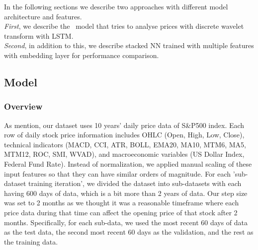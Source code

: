 


In the following sections we describe two approaches with different model architecture and features. \\ 
{\em First}, we describe the \scheme\ model that tries to analyse prices with discrete wavelet transform with LSTM. \\
{\em Second}, in addition to this, we describe stacked NN trained with multiple features with embedding layer for performance comparison.

\subsection{ Model}
\subsubsection{Overview}
\label{sec-jee}

As mention, our dataset uses 10 years’ daily price data of S\&P500 index. Each row of daily stock price information includes OHLC (Open, High, Low, Close), technical indicators (MACD, CCI, ATR, BOLL, EMA20, MA10, MTM6, MA5, MTM12, ROC, SMI, WVAD), and macroeconomic variables (US Dollar Index, Federal Fund Rate). Instead of normalization, we applied manual scaling of these input features so that they can have similar orders of magnitude. For each 'sub-dataset training iteration', we divided the dataset into sub-datasets with each having 600 days of data, which is a bit more than 2 years of data. Our step size was set to 2 months as we thought it was a reasonable timeframe where each price data during that time can affect the opening price of that stock after 2 months. Specifically, for each sub-data, we used the most recent 60 days of data as the test data, the second most recent 60 days as the validation, and the rest as the training data. 

